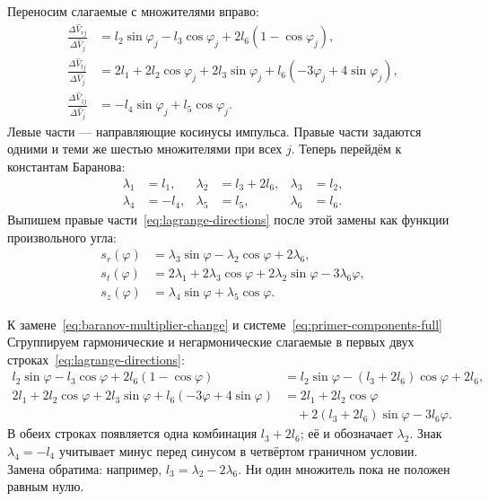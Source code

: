 Переносим слагаемые с множителями вправо:
\begin{equation}
\begin{aligned}
 \frac{\Delta\widehat V_{rj}}{\Delta\widehat V_j}
      &=l_2\sin\varphi_j-l_3\cos\varphi_j+2l_6(1-\cos\varphi_j),\\
 \frac{\Delta\widehat V_{tj}}{\Delta\widehat V_j}
      &=2l_1+2l_2\cos\varphi_j+2l_3\sin\varphi_j
                         +l_6(-3\varphi_j+4\sin\varphi_j),\\
 \frac{\Delta\widehat V_{zj}}{\Delta\widehat V_j}
      &=-l_4\sin\varphi_j+l_5\cos\varphi_j.
\end{aligned}
\label{eq:lagrange-directions}
\end{equation}
Левые части --- направляющие косинусы импульса.
Правые части задаются одними и теми же шестью множителями
при всех $j$. Теперь перейдём к константам Баранова:
\begin{equation}
\boxed{\begin{aligned}
 \lambda_1&=l_1,&\lambda_2&=l_3+2l_6,&\lambda_3&=l_2,\\
 \lambda_4&=-l_4,&\lambda_5&=l_5,&\lambda_6&=l_6.
\end{aligned}}
\label{eq:baranov-multiplier-change}
\end{equation}
Выпишем правые части~\eqref{eq:lagrange-directions}
после этой замены как функции произвольного угла:
\begin{equation}
\boxed{\begin{aligned}
 s_r(\varphi)&=\lambda_3\sin\varphi-\lambda_2\cos\varphi+2\lambda_6,\\
 s_t(\varphi)&=2\lambda_1+2\lambda_3\cos\varphi
                         +2\lambda_2\sin\varphi-3\lambda_6\varphi,\\
 s_z(\varphi)&=\lambda_4\sin\varphi+\lambda_5\cos\varphi.
\end{aligned}}
\label{eq:primer-components-full}
\end{equation}
\begin{explanation}{К замене~\eqref{eq:baranov-multiplier-change}
и системе~\eqref{eq:primer-components-full}}
Сгруппируем гармонические и негармонические слагаемые
в первых двух строках~\eqref{eq:lagrange-directions}:
\[
\begin{aligned}
 l_2\sin\varphi-l_3\cos\varphi+2l_6(1-\cos\varphi)
     &=l_2\sin\varphi-(l_3+2l_6)\cos\varphi+2l_6,\\
 2l_1+2l_2\cos\varphi+2l_3\sin\varphi+l_6(-3\varphi+4\sin\varphi)
     &=2l_1+2l_2\cos\varphi\\
     &\quad+2(l_3+2l_6)\sin\varphi-3l_6\varphi.
\end{aligned}
\]
В обеих строках появляется одна комбинация $l_3+2l_6$;
её и обозначает $\lambda_2$. Знак $\lambda_4=-l_4$
учитывает минус перед синусом в четвёртом граничном условии.
Замена обратима: например, $l_3=\lambda_2-2\lambda_6$.
Ни один множитель пока не положен равным нулю.
\end{explanation}

